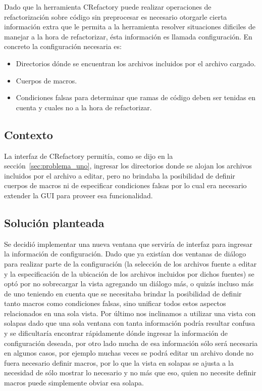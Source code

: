 \documentclass[a4paper,oneside,12pt]{article}
\begin{document}
Dado que la herramienta CRefactory puede realizar operaciones de refactorizaci\'on sobre c\'odigo sin preprocesar es necesario otorgarle cierta informaci\'on extra que le permita a la herramienta resolver situaciones dificiles de manejar a la hora de refactorizar, \'esta informaci\'on es llamada configuraci\'on. En concreto la configuraci\'on necesaria es:

\begin{itemize}
\item Directorios d\'onde se encuentran los archivos incluidos por el archivo cargado.
\item Cuerpos de macros.
\item Condiciones falsas para determinar que ramas de c\'odigo deben ser tenidas en cuenta y cuales no a la hora de refactorizar.
\end{itemize}

\subsection{Contexto}
La interfaz de CRefactory permit\'ia, como se dijo en la secci\'on~\ref{sec:problema_uno}, ingresar los directorios donde se alojan los archivos incluidos por el archivo a editar, pero no brindaba la posibilidad de definir cuerpos de macros ni de especificar condiciones falsas por lo cual era necesario extender la GUI para proveer esa funcionalidad.

\subsection{Soluci\'on planteada}
Se decidi\'o implementar una nueva ventana que servir\'ia de interfaz para ingresar la informaci\'on de configuraci\'on. Dado que ya exist\'ian dos ventanas de di\'alogo para realizar parte de la configuraci\'on (la selecci\'on de los archivos fuente a editar y la especificaci\'on de la ubicaci\'on de los archivos incluidos por dichos fuentes) se opt\'o por no sobrecargar la vista agregando un di\'alogo m\'as, o quiz\'as incluso m\'as de uno teniendo en cuenta que se necesitaba brindar la posibilidad de definir tanto macros como condiciones falsas, sino unificar todos estos aspectos relacionados en una sola vista. Por \'ultimo nos inclinamos a utilizar una vista  con solapas dado que una sola ventana con tanta informaci\'on podr\'ia resultar confusa y se dificultar\'ia encontrar r\'apidamente d\'onde ingresar la informaci\'on de configuraci\'on deseada, por otro lado mucha de esa informaci\'on s\'olo ser\'a necesaria en algunos casos, por ejemplo muchas veces se podr\'a editar un archivo donde no fuera necesario definir macros, por lo que la vista en solapas se ajusta a la necesidad de s\'olo mostrar lo necesario y no m\'as que eso, quien no necesite definir macros puede simplemente obviar esa solapa.
\end{document}
